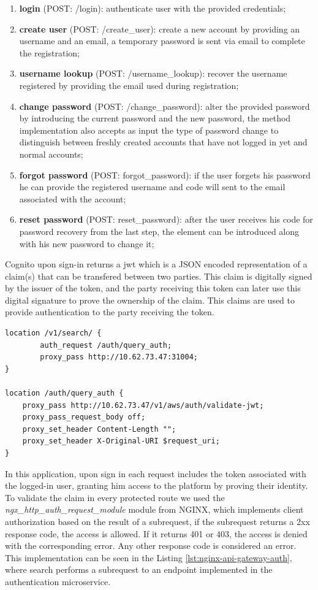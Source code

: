 \begin{enumerate}
    \item \textbf{login} (POST: /login): authenticate user with the provided credentials;
    \item \textbf{create user} (POST: /create\_user): create a new account by providing an username and an email, a temporary password is sent via email to complete the registration;
    \item \textbf{username lookup} (POST: /username\_lookup): recover the username registered by providing the email used during registration;
    \item \textbf{change password} (POST: /change\_password): alter the provided password by introducing the current password and the new password, the method implementation also accepts as input the type of password change to distinguish between freshly created accounts that have not logged in yet and normal accounts;
    \item \textbf{forgot password} (POST: forgot\_password): if the user forgets his password he can provide the registered username and code will sent to the email associated with the account;
    \item \textbf{reset password} (POST: reset\_password): after the user receives his code for password recovery from the last step, the element can be introduced along with his new password to change it; 
\end{enumerate}

Cognito upon sign-in returns a \acrfull{jwt} which is a JSON encoded representation of a claim(s) that can be transfered between two parties. This claim is digitally signed by the issuer of the token, and the party receiving this token can later use this digital signature to prove the ownership of the claim. This claims are used to provide authentication to the party receiving the token.

\begin{lstlisting}[float, caption={Route with authentication}, label={lst:nginx-api-gateway-auth}, captionpos=t]
location /v1/search/ {
        auth_request /auth/query_auth;
        proxy_pass http://10.62.73.47:31004;
}

location /auth/query_auth {
    proxy_pass http://10.62.73.47/v1/aws/auth/validate-jwt;
    proxy_pass_request_body off;
    proxy_set_header Content-Length "";
    proxy_set_header X-Original-URI $request_uri;
}
\end{lstlisting}

In this application, upon sign in each request includes the token associated with the logged-in user, granting him access to the platform by proving their identity. To validate the claim in every protected route we used the \textit{ngx\_http\_auth\_request\_module} module from NGINX, which implements client authorization based on the result of a subrequest, if the subrequest returns a 2xx response code, the access is allowed. If it returns 401 or 403, the access is denied with the corresponding error. Any other response code is considered an error. This implementation can be seen in the Listing \ref{lst:nginx-api-gateway-auth}, where search performs a subrequest to an endpoint implemented in the authentication microservice.

